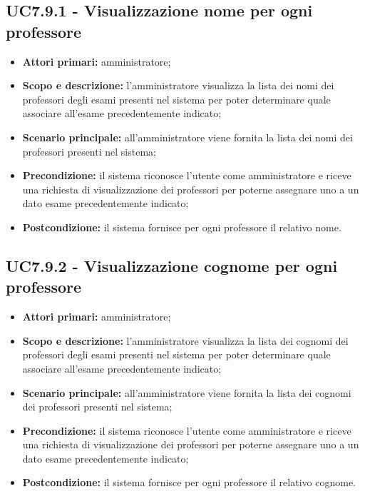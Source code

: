 \documentclass[AnalisiDeiRequisiti.tex]{subfiles}
\begin{document}
\subsection{UC7.9.1 - Visualizzazione nome per ogni professore}
\begin{itemize}
	\item \textbf{Attori primari:} amministratore;
	\item \textbf{Scopo e descrizione:} l'amministratore visualizza la lista dei nomi dei professori degli esami presenti nel sistema per poter determinare quale associare all'esame precedentemente indicato;
	\item \textbf{Scenario principale:} all'amministratore viene fornita la lista dei nomi dei professori presenti nel sistema;
	\item \textbf{Precondizione:} il sistema riconosce l'utente come amministratore e riceve una richiesta di visualizzazione dei professori per poterne assegnare uno a un dato esame precedentemente indicato; 
	\item \textbf{Postcondizione:} il sistema fornisce per ogni professore il relativo nome.
\end{itemize}
\subsection{UC7.9.2 - Visualizzazione cognome per ogni professore}
\begin{itemize}
	\item \textbf{Attori primari:} amministratore;
	\item \textbf{Scopo e descrizione:} l'amministratore visualizza la lista dei cognomi dei professori degli esami presenti nel sistema per poter determinare quale associare all'esame precedentemente indicato;
	\item \textbf{Scenario principale:} all'amministratore viene fornita la lista dei cognomi dei professori presenti nel sistema;
	\item \textbf{Precondizione:} il sistema riconosce l'utente come amministratore e riceve una richiesta di visualizzazione dei professori per poterne assegnare uno a un dato esame precedentemente indicato; 
	\item \textbf{Postcondizione:} il sistema fornisce per ogni professore il relativo cognome.
\end{itemize}
\end{document}
